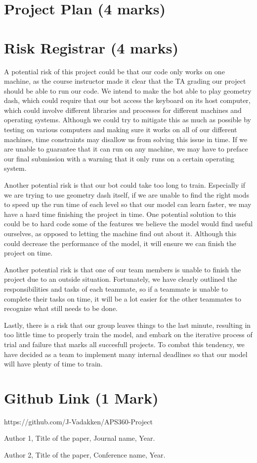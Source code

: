 \documentclass{article}
\begin{document}
\section{Project Plan (4 marks)}

\section{Risk Registrar (4 marks)}
A potential risk of this project could be that our code only works on one machine, as the course instructor made it clear that the TA grading our project should be able to run our code. We intend to make the bot able to play geometry dash, which could require that our bot access the keyboard on its host computer, which could involve different libraries and processes for different machines and operating systems. Although we could try to mitigate this as much as possible by testing on various computers and making sure it works on all of our different machines, time constraints may disallow us from solving this issue in time. If we are unable to guarantee that it can run on any machine, we may have to preface our final submission with a warning that it only runs on a certain operating system. 

Another potential risk is that our bot could take too long to train. Especially if we are trying to use geometry dash itself, if we are unable to find the right mods to speed up the run time of each level so that our model can learn faster, we may have a hard time finishing the project in time. One potential solution to this could be to hard code some of the features we believe the model would find useful ourselves, as opposed to letting the machine find out about it. Although this could decrease the performance of the model, it will ensure we can finish the project on time. 

Another potential risk is that one of our team members is unable to finish the project due to an outside situation. Fortunately, we have clearly outlined the responsibilities and tasks of each teammate, so if a teammate is unable to complete their tasks on time, it will be a lot easier for the other teammates to recognize what still needs to be done.

Lastly, there is a risk that our group leaves things to the last minute, resulting in too little time to properly train the model, and embark on the iterative process of trial and failure that marks all succesfull projects. To combat this tendency, we have decided as a team to implement many internal deadlines so that our model will have plenty of time to train.


\section{Github Link (1 Mark)}
https://github.com/J-Vadakken/APS360-Project

\begin{thebibliography}{9}
Author 1, Title of the paper, Journal name, Year.

Author 2, Title of the paper, Conference name, Year.
\end{thebibliography}
\end{document}
